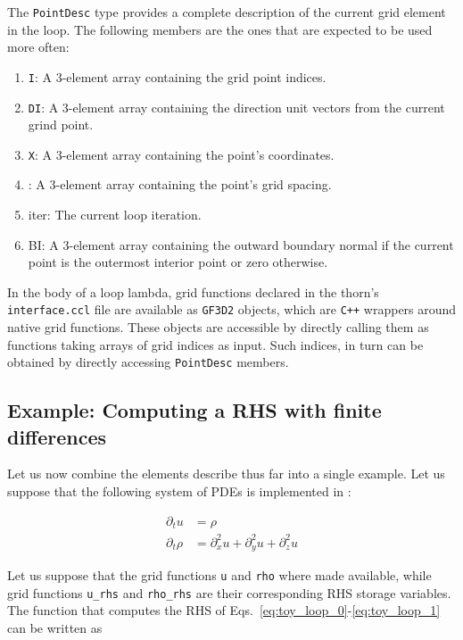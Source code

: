 The \texttt{PointDesc} type provides a complete description of the current grid element in the loop. The following members are the ones that are expected to be used more often:
%
\begin{enumerate}
  \item \texttt{I}: A 3-element array containing the grid point indices.
  \item \texttt{DI}: A 3-element array containing the direction unit vectors from the current grind point.
  \item \texttt{X}: A 3-element array containing the point's coordinates.
  \item {}: A 3-element array containing the point's grid spacing.
  \item {iter}: The current loop iteration.
  \item {BI}: A 3-element array containing the outward boundary normal if the current point is the outermost interior point or zero otherwise.
\end{enumerate}

In the body of a loop lambda, grid functions declared in the thorn's \texttt{interface.ccl} file are available as \texttt{GF3D2} objects, which are \texttt{C++} wrappers around native \Cactus\space grid functions. These objects are accessible by directly calling them as functions taking arrays of grid indices as input. Such indices, in turn can be obtained by directly accessing \texttt{PointDesc} members.

\subsection{Example: Computing a RHS with finite differences}

Let us now combine the elements describe thus far into a single example. Let us suppose that the following system of PDEs is implemented in \Cactus:

\begin{align}
  \partial_t u & = \rho \label{eq:toy_loop_0}\\
  \partial_t \rho & = \partial_x^2 u + \partial_y^2 u + \partial_z^2 u \label{eq:toy_loop_1}
\end{align}

Let us suppose that the grid functions \texttt{u} and \texttt{rho} where made available, while grid functions \texttt{u\_rhs} and \texttt{rho\_rhs} are their corresponding RHS storage variables. The function that computes the RHS of Eqs.~\eqref{eq:toy_loop_0}-\eqref{eq:toy_loop_1} can be written as


